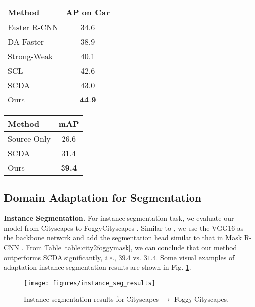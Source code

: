 \documentclass[runningheads]{llncs}
\def\ie{{\em i.e.}}
\begin{document}
\begin{table*}[t]
\begin{minipage}{0.49\linewidth}
\centering
\caption{Adaptation detection results from Sim10k to Cityscapes.}
\setlength{\tabcolsep}{9.5pt}
\begin{tabular}{l|c}
\hline\noalign{\smallskip}
Method & AP on Car \\
\hline
Faster R-CNN                   & 34.6    \\
DA-Faster \cite{DBLP:conf/cvpr/Chen0SDG18}& 38.9    \\
Strong-Weak \cite{DBLP:conf/cvpr/SaitoUHS19} & 40.1    \\
SCL \cite{DBLP:journals/corr/abs-1911-02559}         & 42.6    \\
SCDA \cite{DBLP:conf/cvpr/ZhuPYSL19}  & 43.0 \\
Ours                          & {\bf 44.9}    \\
\hline
\end{tabular}
\label{table:sim102city}
\end{minipage}
\begin{minipage}{0.49\linewidth}
\centering
\caption{Adaptation instance segmentation results from Cityscapes to FoggyCityscapes.}
\setlength{\tabcolsep}{9.5pt}
\begin{tabular}{l|c}
\hline\noalign{\smallskip}
Method & mAP \\
\hline
Source Only                   & 26.6    \\
SCDA \cite{DBLP:conf/cvpr/ZhuPYSL19}& 31.4    \\
Ours                          &{\bf 39.4}    \\
\hline
\end{tabular}
\label{table:city2foggymask}
\end{minipage}
\end{table*}

\subsection{Domain Adaptation for Segmentation}
\noindent \textbf{Instance Segmentation.}
For instance segmentation task, we evaluate our model from Cityscapes \cite{DBLP:conf/cvpr/CordtsORREBFRS16} to FoggyCityscapes \cite{DBLP:journals/ijcv/SakaridisDG18}. Similar to \cite{DBLP:conf/cvpr/ZhuPYSL19}, we use the VGG16 as the backbone network and add the segmentation head similar to that in Mask R-CNN \cite{DBLP:conf/iccv/HeGDG17}. From Table \ref{table:city2foggymask}, we can conclude that our method outperforms SCDA \cite{DBLP:conf/cvpr/ZhuPYSL19} significantly, \ie, $39.4$ vs. $31.4$. Some visual examples of adaptation instance segmentation results are shown in Fig. \ref{fig:instance}.
\begin{figure}[t]
\centering
\texttt{[image: figures/instance\_seg\_results]}
\caption{Instance segmentation results for Cityscapes $\to$ Foggy Cityscapes.}
\label{fig:instance}
\end{figure}
\end{document}
